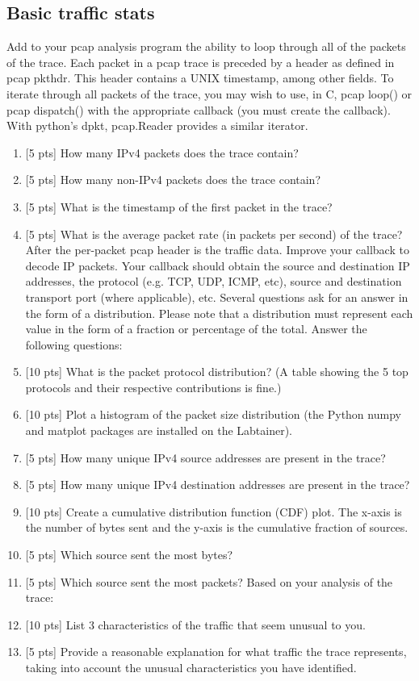 \subsection{Basic traffic stats}
Add to your pcap analysis program the ability to loop through all of the packets of the trace. Each packet in a pcap trace is preceded by a header as defined in pcap pkthdr. This header contains a UNIX timestamp, among other fields. To iterate through all packets of the trace, you may wish to use, in C, pcap loop() or pcap dispatch() with the appropriate callback (you must create the callback). With python’s dpkt, pcap.Reader provides a similar iterator.
\begin{enumerate}
\item {[5 pts]} How many IPv4 packets does the trace contain?
\item {[5 pts]} How many non-IPv4 packets does the trace contain?
\item {[5 pts]} What is the timestamp of the first packet in the trace?
\item {[5 pts]} What is the average packet rate (in packets per second) of the trace?
After the per-packet pcap header is the traffic data. Improve your callback to decode IP packets. Your callback should obtain the source and destination IP addresses, the protocol (e.g. TCP, UDP, ICMP, etc), source and destination transport port (where applicable), etc.
Several questions ask for an answer in the form of a distribution. Please note that a distribution must represent each value in the form of a fraction or percentage of the total. Answer the following questions:
\item {[10 pts]} What is the packet protocol distribution? (A table showing the 5 top protocols and their respective contributions is fine.)
\item {[10 pts]} Plot a histogram of the packet size distribution (the Python numpy and matplot packages are installed on the Labtainer).
\item {[5 pts]} How many unique IPv4 source addresses are present in the trace?
\item {[5 pts]} How many unique IPv4 destination addresses are present in the trace?
\item {[10 pts]} Create a cumulative distribution function (CDF) plot. The x-axis is the number of bytes sent and the y-axis is the cumulative fraction of sources.
\item {[5 pts]} Which source sent the most bytes?
\item {[5 pts]} Which source sent the most packets?
Based on your analysis of the trace:
\item {[10 pts]} List 3 characteristics of the traffic that seem unusual to you.
\item {[5 pts]} Provide a reasonable explanation for what traffic the trace represents, taking into account the unusual characteristics you have identified.
\end{enumerate}

